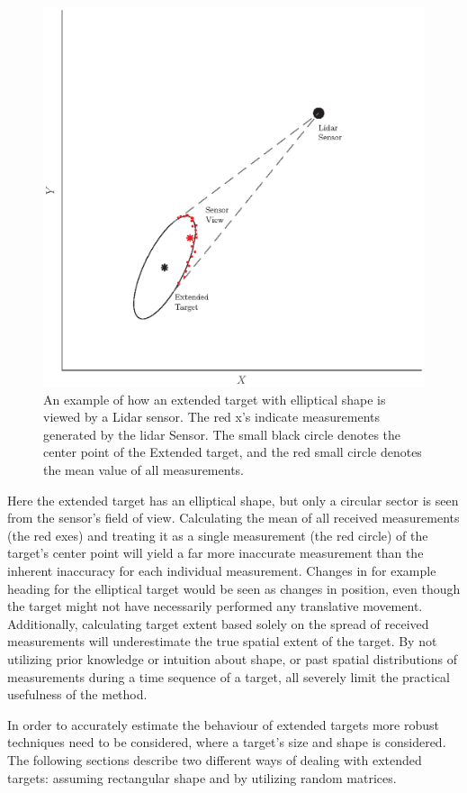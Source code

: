 \begin{figure}[ht]
    \centering
    \includegraphics[width = 0.8\linewidth]{include/images/spatialExample.eps}
    \caption{An example of how an extended target with elliptical shape is viewed by a Lidar sensor. The red x's indicate measurements generated by the lidar Sensor. The small black circle denotes the center point of the Extended target, and the red small circle denotes the mean value of all measurements.}
    \label{fig:spatialExample}
\end{figure}

Here the extended target has an elliptical shape, but only a circular sector is seen from the sensor's field of view. Calculating the mean of all received measurements (the red exes) and treating it as a single measurement (the red circle) of the target's center point will yield a far more inaccurate measurement than the inherent inaccuracy for each individual measurement. Changes in for example heading for the elliptical target would be seen as changes in position, even though the target might not have necessarily performed any translative movement. Additionally, calculating target extent based solely on the spread of received measurements will underestimate the true spatial extent of the target. By not utilizing prior knowledge or intuition about shape, or past spatial distributions of measurements during a time sequence of a target, all severely limit the practical usefulness of the method.

In order to accurately estimate the behaviour of extended targets more robust techniques need to be considered, where a target's size and shape is considered. The following sections describe two different ways of dealing with extended targets: assuming rectangular shape and by utilizing random matrices.

